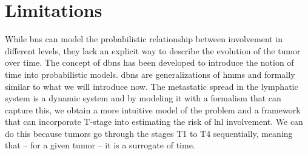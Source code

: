 \documentclass[\relativeRoot/main.tex]{subfiles}
\begin{document}
\section{Limitations}
\label{sec:previous_work:limitations}

While \glspl{bn} can model the probabilistic relationship between involvement in different levels, they lack an explicit way to describe the evolution of the tumor over time. The concept of \glspl{dbn} has been developed to introduce the notion of time into probabilistic models. \Glspl{dbn} are generalizations of \glspl{hmm} and formally similar to what we will introduce now. The metastatic spread in the lymphatic system is a dynamic system and by modeling it with a formalism that can capture this, we obtain a more intuitive model of the problem and a framework that can incorporate T-stage into estimating the risk of \gls{lnl} involvement. We can do this because tumors go through the stages T1 to T4 sequentially, meaning that – for a given tumor – it is a surrogate of time.
\end{document}
